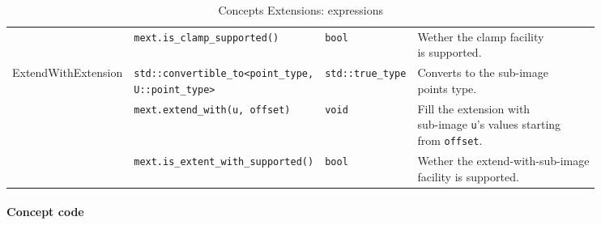 \begin{table}[H]
\begin{scriptsize}
\begin{tabular}{llll}
      \multicolumn{1}{c|}{}                                        & \texttt{mext.is\_clamp\_supported()}          &
      \texttt{bool}                                                & \makecell[l]{Wether the clamp facility                                                    \\is supported.}                                       \\
      \cline{1-4}
      \multicolumn{1}{c|}{\multirow{3}{*}{ExtendWithExtension}}    &
      \makecell[l]{\texttt{std::convertible\_to<point\_type,}                                                                                                  \\\texttt{U::point\_type>}} & \texttt{std::true\_type} &
      \makecell[l]{Converts to the sub-image                                                                                                                   \\ points type.}                                                                                                       \\
      \multicolumn{1}{c|}{}                                        & \texttt{mext.extend\_with(u, offset)}         &
      \texttt{void}                                                & \makecell[l]{Fill the extension with                                                      \\sub-image      \texttt{u}'s values  starting \\ from \texttt{offset}.} \\
      \multicolumn{1}{c|}{}                                        & \texttt{mext.is\_extent\_with\_supported()}   &
      \texttt{bool}                                                & \makecell[l]{Wether the extend-with-sub-image                                             \\ facility is
      supported.}                                                                                                                                              \\
      \cline{1-4}
    \end{tabular}
    \smallskip

    \caption{Concepts Extensions: expressions}
  \end{scriptsize}
  \label{table:concept.extensions.expressions}
\end{table}

\paragraph{Concept code}

